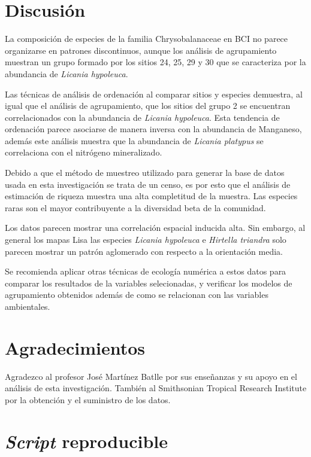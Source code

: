 \documentclass[11pt,]{article}
\begin{document}
\section{Discusión}\label{discusiuxf3n}

La composición de especies de la familia Chrysobalanaceae en BCI no
parece organizarse en patrones discontinuos, aunque los análisis de
agrupamiento muestran un grupo formado por los sitios 24, 25, 29 y 30
que se caracteriza por la abundancia de \emph{Licania hypoleuca}.

Las técnicas de análisis de ordenación al comparar sitios y especies
demuestra, al igual que el análisis de agrupamiento, que los sitios del
grupo 2 se encuentran correlacionados con la abundancia de \emph{Licania
hypoleuca}. Esta tendencia de ordenación parece asociarse de manera
inversa con la abundancia de Manganeso, además este análisis muestra que
la abundancia de \emph{Licania platypus} se correlaciona con el
nitrógeno mineralizado.

Debido a que el método de muestreo utilizado para generar la base de
datos usada en esta investigación se trata de un censo, es por esto que
el análisis de estimación de riqueza muestra una alta completitud de la
muestra. Las especies raras son el mayor contribuyente a la diversidad
beta de la comunidad.

Los datos parecen mostrar una correlación espacial inducida alta. Sin
embargo, al general los mapas Lisa las especies \emph{Licania hypoleuca}
e \emph{Hirtella triandra} solo parecen mostrar un patrón aglomerado con
respecto a la orientación media.

Se recomienda aplicar otras técnicas de ecología numérica a estos datos
para comparar los resultados de la variables selecionadas, y verificar
los modelos de agrupamiento obtenidos además de como se relacionan con
las variables ambientales.

\section{Agradecimientos}\label{agradecimientos}

Agradezco al profesor José Martínez Batlle por sus enseñanzas y su apoyo
en el análisis de esta investigación. También al Smithsonian Tropical
Research Institute por la obtención y el suministro de los datos.

\section{\texorpdfstring{\emph{Script}
reproducible}{Script reproducible}}\label{script-reproducible}
\end{document}
